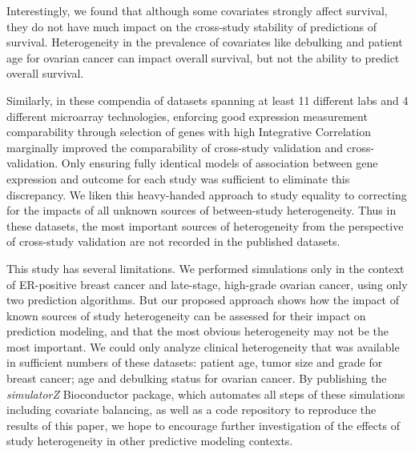\documentclass{bioinfo}
\begin{document}
Interestingly, we found that although some covariates strongly affect survival, 
they do not have much impact on the cross-study stability of
predictions of survival.  Heterogeneity in the prevalence 
of covariates like debulking and patient age for ovarian cancer can impact 
overall survival, but not the ability to predict overall survival.

Similarly, in these compendia of datasets spanning at least 11 different labs
and 4 different microarray technologies, enforcing good
expression measurement comparability through selection of genes with
high Integrative Correlation \citep{Parmigiani2004, Garrett-Mayer2008} marginally improved
the comparability of cross-study validation and cross-validation. Only
ensuring fully identical models of association between gene expression
and outcome for each study was sufficient to eliminate this
discrepancy. %
We liken this heavy-handed approach to study equality to
correcting for the impacts of all unknown sources of
between-study heterogeneity. Thus in these datasets, the most
important sources of heterogeneity from the perspective of cross-study
validation are not recorded in the published datasets.

This study has several limitations. %
We performed simulations only in the context of ER-positive breast cancer and
late-stage, high-grade ovarian cancer, using only two prediction algorithms. But our proposed
approach shows how the impact of known sources of study heterogeneity
can be assessed for their impact on prediction modeling, and that the
most obvious heterogeneity may not be the most important. 
We could only analyze clinical
heterogeneity that was available in sufficient numbers of these
datasets: patient age, tumor size and grade for breast cancer;
age and debulking status for ovarian cancer.  By
publishing the \emph{simulatorZ} Bioconductor package, which automates
all steps of these simulations including covariate balancing, as well
as a code repository to reproduce the results of this paper, we hope
to encourage further investigation of the effects of study
heterogeneity in other predictive modeling contexts.
\end{document}
